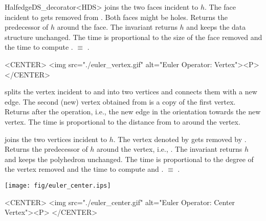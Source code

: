 \begin{ccRefClass}{HalfedgeDS_decorator<HDS>}
    {joins the two faces incident to $h$. The face incident to
       gets removed from . Both faces might be
    holes. Returns the predecessor of $h$ around the face. The invariant
     returns $h$ and keeps
    the data structure unchanged. The time is proportional to the size
    of the face removed and the time to compute .
      $\equiv$
    .}


\begin{ccHtmlOnly}
    <CENTER>
    <img src="./euler_vertex.gif" alt="Euler Operator: Vertex"><P>
    </CENTER>
\end{ccHtmlOnly}

    {splits the vertex incident to  and  into two vertices
     and connects them with a new edge. The second (new) vertex
     obtained from  is a copy of the first vertex. Returns
      after the operation, i.e., the new edge
     in the orientation towards the new vertex. The time is proportional 
     to the distance from  to  around the vertex.} 

    {joins the two vertices incident to $h$. The vertex denoted by
      gets removed by . Returns the predecessor of
     $h$ around the vertex, i.e., . The invariant 
      returns $h$
     and keeps the polyhedron unchanged. 
     The time is proportional to the degree of the vertex removed and 
     the time to compute  and .
       $\equiv$
     .}

\begin{ccTexOnly}
    \begin{center}
      \parbox{0.52\textwidth}{%
          \texttt{[image: fig/euler\_center.ips]}%
      }
    \end{center}
\end{ccTexOnly}

\begin{ccHtmlOnly}
    <CENTER>
    <img src="./euler_center.gif" alt="Euler Operator: Center Vertex"><P>
    </CENTER>
\end{ccHtmlOnly}


\end{ccRefClass}
